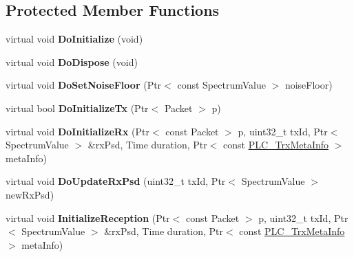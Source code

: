 \subsection*{\-Protected \-Member \-Functions}
\begin{DoxyCompactItemize}
\item 
\hypertarget{classns3_1_1PLC__InformationRatePhy_a3bac5d0eeb36cee3bdf9a880be7495e8}{virtual void {\bfseries \-Do\-Initialize} (void)}\label{classns3_1_1PLC__InformationRatePhy_a3bac5d0eeb36cee3bdf9a880be7495e8}

\item 
\hypertarget{classns3_1_1PLC__InformationRatePhy_a6cb0013270e368139cf710371cf8c9ff}{virtual void {\bfseries \-Do\-Dispose} (void)}\label{classns3_1_1PLC__InformationRatePhy_a6cb0013270e368139cf710371cf8c9ff}

\item 
\hypertarget{classns3_1_1PLC__InformationRatePhy_a79700be8272f4156d23ec6356f675be9}{virtual void {\bfseries \-Do\-Set\-Noise\-Floor} (\-Ptr$<$ const \-Spectrum\-Value $>$ noise\-Floor)}\label{classns3_1_1PLC__InformationRatePhy_a79700be8272f4156d23ec6356f675be9}

\item 
\hypertarget{classns3_1_1PLC__InformationRatePhy_a1746d2858e9596d44e87e5a5c3dcdd73}{virtual bool {\bfseries \-Do\-Initialize\-Tx} (\-Ptr$<$ \-Packet $>$ p)}\label{classns3_1_1PLC__InformationRatePhy_a1746d2858e9596d44e87e5a5c3dcdd73}

\item 
\hypertarget{classns3_1_1PLC__InformationRatePhy_a7d14bce650ce44e393422441b83ab1a1}{virtual void {\bfseries \-Do\-Initialize\-Rx} (\-Ptr$<$ const \-Packet $>$ p, uint32\-\_\-t tx\-Id, \-Ptr$<$ \-Spectrum\-Value $>$ \&rx\-Psd, \-Time duration, \-Ptr$<$ const \hyperlink{classns3_1_1PLC__TrxMetaInfo}{\-P\-L\-C\-\_\-\-Trx\-Meta\-Info} $>$ meta\-Info)}\label{classns3_1_1PLC__InformationRatePhy_a7d14bce650ce44e393422441b83ab1a1}

\item 
\hypertarget{classns3_1_1PLC__InformationRatePhy_a6bc7022d2f5a664d7b0cb422758af210}{virtual void {\bfseries \-Do\-Update\-Rx\-Psd} (uint32\-\_\-t tx\-Id, \-Ptr$<$ \-Spectrum\-Value $>$ new\-Rx\-Psd)}\label{classns3_1_1PLC__InformationRatePhy_a6bc7022d2f5a664d7b0cb422758af210}

\item 
\hypertarget{classns3_1_1PLC__InformationRatePhy_a57c6636bedb4b579414371f12395a8d6}{virtual void {\bfseries \-Initialize\-Reception} (\-Ptr$<$ const \-Packet $>$ p, uint32\-\_\-t tx\-Id, \-Ptr$<$ \-Spectrum\-Value $>$ \&rx\-Psd, \-Time duration, \-Ptr$<$ const \hyperlink{classns3_1_1PLC__TrxMetaInfo}{\-P\-L\-C\-\_\-\-Trx\-Meta\-Info} $>$ meta\-Info)}\label{classns3_1_1PLC__InformationRatePhy_a57c6636bedb4b579414371f12395a8d6}


\end{DoxyCompactItemize}

